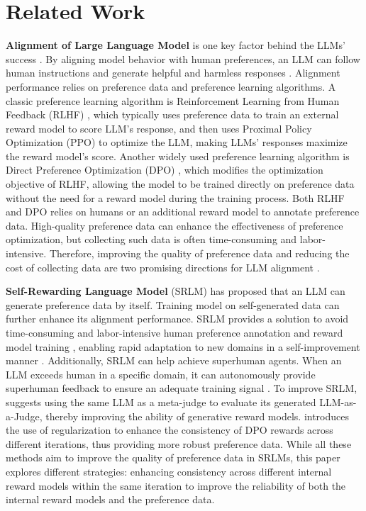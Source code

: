 \section{Related Work}
\textbf{Alignment of Large Language Model} is one key factor behind the LLMs' success \cite{bommasani2021opportunities,wang2023aligninglargelanguagemodels}. 
By aligning model behavior with human preferences, an LLM can follow human instructions and generate helpful and harmless responses \cite{bai2022traininghelpfulharmlessassistant}.  
Alignment performance relies on preference data and preference learning algorithms. 
A classic preference learning algorithm is Reinforcement Learning from Human Feedback (RLHF) \cite{bai2022training,bai2022constitutional,ouyang2022training}, which typically uses preference data to train an external reward model to score LLM's response, and then uses Proximal Policy Optimization (PPO) \cite{schulman2017proximalpolicyoptimizationalgorithms} to optimize the LLM, making LLMs' responses maximize the reward model’s score. 
Another widely used preference learning algorithm is Direct Preference Optimization (DPO) \cite{rafailov2024direct}, which modifies the optimization objective of RLHF, allowing the model to be trained directly on preference data without the need for a reward model during the training process. 
Both RLHF and DPO relies on humans or an additional reward model to annotate preference data. 
High-quality preference data can enhance the effectiveness of preference optimization, but collecting such data is often time-consuming and labor-intensive. 
Therefore, improving the quality of preference data and reducing the cost of collecting data are two promising directions for LLM alignment \cite{kaufmann2024surveyreinforcementlearninghuman,casper2023openproblemsfundamentallimitations}.


\textbf{Self-Rewarding Language Model} (SRLM) \cite{yuanself} has proposed that an LLM can generate preference data by itself. Training model on self-generated data can further enhance its alignment performance. 
SRLM provides a solution to avoid time-consuming and labor-intensive human preference annotation and reward model training \cite{bai2022training}, enabling rapid adaptation to new domains in a self-improvement manner \cite{huang2022largelanguagemodelsselfimprove}. 
Additionally, SRLM can help achieve superhuman agents. When an LLM exceeds human in a specific domain, it can autonomously provide superhuman feedback to ensure an adequate training signal \cite{burns2023weak}. 
To improve SRLM, \citet{anonymous2024metarewarding} 
suggests using the same LLM as a meta-judge to evaluate its generated LLM-as-a-Judge, thereby improving the ability of generative reward models. \citet{wang2024creamconsistencyregularizedselfrewarding} introduces the use of regularization to enhance the consistency of DPO rewards across different iterations, thus providing more robust preference data. 
While all these methods aim to improve the quality of preference data in SRLMs, this paper explores different strategies: enhancing consistency across different internal reward models within the same iteration to improve the reliability of both the internal reward models and the preference data.